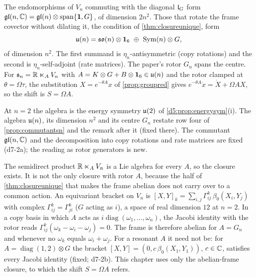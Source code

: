 \begin{proposition}
\label{d7:prop:rotor}
The endomorphisms of $V_n$ commuting with the diagonal $\mathfrak l_G$ form $\mathfrak{gl}(n,\mathbb{C})=\mathfrak{gl}(n)\otimes\operatorname{span}\{\mathbf 1,G\}$, of dimension
$2n^2$. Those that rotate the frame covector without dilating it, the condition of \cref{thm:closureunique}, form
\[
\uu n=\so n\otimes\id_6\ \oplus\ \operatorname{Sym}(n)\otimes G ,
\]
of dimension $n^2$. The first summand is $\eta_n$-antisymmetric (copy rotations) and the second is $\eta_n$-self-adjoint (rate matrices). The paper's
rotor $G_n$ spans the centre. For $\mathfrak s_n=\mathbb{R}\ltimes_AV_n$ with $A=K\otimes G+B\otimes\mathbf 1_6\in\mathfrak{u}(n)$ and the rotor clamped at $\theta=\Omega\tau$, the substitution $X=e^{-\theta A}x$ of \cref{prop:groupred} gives $e^{-\theta A}\dot x=\dot X+\Omega AX$, so the shift is $S=\Omega A$.
\end{proposition}

At $n=2$ the algebra is the energy symmetry $\mathfrak{u}(2)$ of \cref{d5:prop:energysym}(i). The algebra $\mathfrak{u}(n)$, its dimension $n^2$ and its centre $G_n$
restate row four of \cref{prop:commutantsn} and the remark after it (fixed there). The commutant $\mathfrak{gl}(n,\mathbb{C})$ and the
decomposition into copy rotations and rate matrices are fixed (d7-2a); the reading as rotor generators is new.

The semidirect product $\mathbb{R}\ltimes_AV_n$ is a Lie algebra for every $A$, so the closure exists. It is not the only closure with rotor $A$, because
the half of \cref{thm:closureunique} that makes the frame abelian does not carry over to a common action. An equivariant bracket on $V_n$ is
$[X,Y]_k=\sum_{i,j}\Gamma^k_{ij}\,\beta_0(X_i,Y_j)$ with complex $\Gamma^k_{ij}=\Gamma^k_{ji}$ ($G$ acting as $i$), a space of real dimension $12$ at $n=2$. In a
copy basis in which $A$ acts as $i\operatorname{diag}(\omega_1,\dots,\omega_n)$, the Jacobi identity with the rotor reads $\Gamma^k_{ij}(\omega_k-\omega_i-\omega_j)=0$. The
frame is therefore abelian for $A=G_n$ and whenever no $\omega_k$ equals $\omega_i+\omega_j$. For a resonant $A$ it need not be: for
$A=\operatorname{diag}(1,2)\otimes G$ the bracket $[X,Y]=(0,c\,\beta_0(X_1,Y_1))$, $c\in\mathbb{C}$, satisfies every Jacobi identity (fixed; d7-2b). This chapter uses only the abelian-frame closure, to which the shift $S=\Omega A$ refers.

